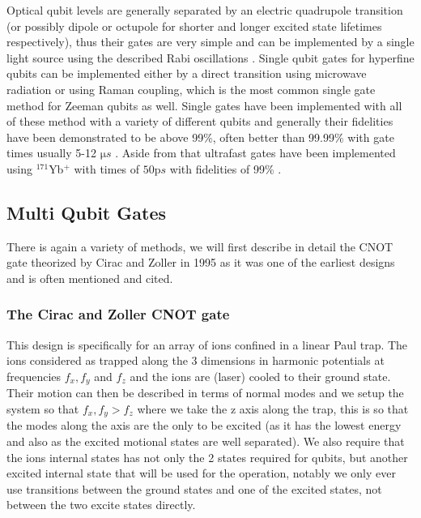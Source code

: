 Optical qubit levels are generally separated by an electric quadrupole transition (or possibly dipole or octupole for shorter and longer excited state lifetimes respectively), thus their gates are very simple and can be implemented by a single light source using the described Rabi oscillations \cite{bruzewiczTrappedionQuantumComputing2019}.
Single qubit gates for hyperfine qubits can be implemented either by a direct transition using microwave radiation or using Raman coupling, which is the most common single gate method for Zeeman qubits as well.
Single gates have been implemented with all of these method with a variety of different qubits and generally their fidelities have been demonstrated to be above 99\%, often better than 99.99\% with gate times usually 5-12 $\si{\micro s}$ \cite{bruzewiczTrappedionQuantumComputing2019}.
Aside from that ultrafast gates have been implemented using $^{171}$Yb$^+$ with times of $50\si{\pico s}$ with fidelities of 99\% \cite{campbellUltrafastGatesSingle2010}.

\subsection{Multi Qubit Gates}
There is again a variety of methods, we will first describe in detail the CNOT gate theorized by Cirac and Zoller in 1995 \cite{ciracQuantumComputationsCold1995} as it was one of the earliest designs and is often mentioned and cited.

\subsubsection{The Cirac and Zoller CNOT gate \cite{ciracQuantumComputationsCold1995}}
This design is specifically for an array of ions confined in a linear Paul trap.
The ions considered as trapped along the 3 dimensions in harmonic potentials at frequencies $f_x, f_y$ and $f_z$ and the ions are (laser) cooled to their ground state.
Their motion can then be described in terms of normal modes and we setup the system so that $f_x, f_y > f_z$ where we take the z axis along the trap, this is so that the modes along the axis are the only to be excited (as it has the lowest energy and also as the excited motional states are well separated).
We also require that the ions internal states has not only the 2 states required for qubits, but another excited internal state that will be used for the operation, notably we only ever use transitions between the ground states and one of the excited states, not between the two excite states directly.

